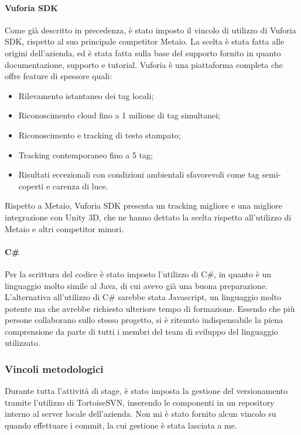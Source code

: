 \paragraph{Vuforia SDK}
Come gi\`a descritto in precedenza, \`e stato imposto il vincolo di utilizzo di Vuforia SDK, rispetto al suo principale competitor Metaio. La scelta \`e stata fatta alle origini dell'azienda, ed \`e stata fatta sulla base del supporto fornito in quanto documentazione, supporto e tutorial. Vuforia \`e una piattaforma completa che offre feature di spessore quali:

\begin{itemize}
	\item Rilevamento istantaneo dei tag locali;
	\item Riconoscimento cloud fino a 1 milione di tag simultanei;
	\item Riconoscimento e tracking di testo stampato;
	\item Tracking contemporaneo fino a 5 tag;
	\item Risultati eccezionali con condizioni ambientali sfavorevoli come tag semi-coperti e carenza di luce.
\end{itemize}

Rispetto a Metaio, Vuforia SDK presenta un tracking migliore e una migliore integrazione con Unity 3D, che ne hanno dettato la scelta rispetto all'utilizzo di Metaio e altri competitor minori. 


\paragraph{C\#}
Per la scrittura del codice \`e stato imposto l'utilizzo di C\#, in quanto \`e un linguaggio molto simile al Java, di cui avevo gi\`a una buona preparazione. L'alternativa all'utilizzo di C\# sarebbe stata Javascript, un linguaggio molto potente ma che avrebbe richiesto ulteriore tempo di formazione. Essendo che pi\`u persone collaborano sullo stesso progetto, si \`e ritenuto indispensabile la piena comprensione da parte di tutti i membri del team di sviluppo del linguaggio utilizzato.

\subsubsection{Vincoli metodologici}
Durante tutta l’attività di stage, \`e stato imposta la gestione del versionamento tramite l'utilizzo di TortoiseSVN, inserendo le componenti in un repository interno al server locale dell'azienda. Non mi \`e stato fornito alcun vincolo su quando effettuare i commit, la cui gestione \`e stata lasciata a me.

